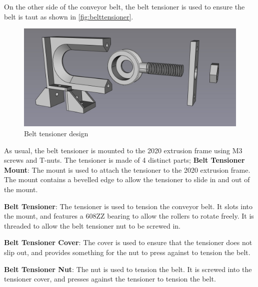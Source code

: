 On the other side of the conveyor belt, the belt tensioner is used to ensure the belt is taut as shown in \autoref{fig:belttensioner}.

\begin{figure}[H]
    \begin{minipage}[h]{0.95\textwidth}
        \centering
        \includegraphics[width=\textwidth]{imgs/freecad/belttensioner.jpg}
        \caption{Belt tensioner design}
        \label{fig:belttensioner}
    \end{minipage}
\end{figure}

As usual, the belt tensioner is mounted to the 2020 extrusion frame using M3 screws and T-nuts. The tensioner is made of 4 distinct parts;
\textbf{Belt Tensioner Mount}: The mount is used to attach the tensioner to the 2020 extrusion frame. The mount contains a bevelled edge to allow the tensioner to slide in and out of the mount.
\par
\textbf{Belt Tensioner}: The tensioner is used to tension the conveyor belt. It slots into the mount, and features a 608ZZ bearing to allow the rollers to rotate freely. It is threaded to allow the belt tensioner nut to be screwed in.
\par
\textbf{Belt Tensioner Cover}: The cover is used to ensure that the tensioner does not slip out, and provides something for the nut to press against to tension the belt.
\par
\textbf{Belt Tensioner Nut}: The nut is used to tension the belt. It is screwed into the tensioner cover, and presses against the tensioner to tension the belt.


